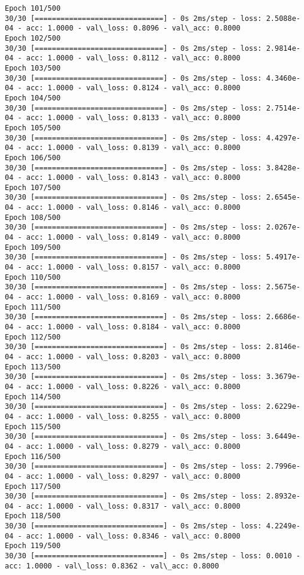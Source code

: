 \documentclass[11pt]{article}
\begin{document}
\begin{Verbatim}[commandchars=\\\{\}]
Epoch 101/500
30/30 [==============================] - 0s 2ms/step - loss: 2.5088e-04 - acc: 1.0000 - val\_loss: 0.8096 - val\_acc: 0.8000
Epoch 102/500
30/30 [==============================] - 0s 2ms/step - loss: 2.9814e-04 - acc: 1.0000 - val\_loss: 0.8112 - val\_acc: 0.8000
Epoch 103/500
30/30 [==============================] - 0s 2ms/step - loss: 4.3460e-04 - acc: 1.0000 - val\_loss: 0.8124 - val\_acc: 0.8000
Epoch 104/500
30/30 [==============================] - 0s 2ms/step - loss: 2.7514e-04 - acc: 1.0000 - val\_loss: 0.8133 - val\_acc: 0.8000
Epoch 105/500
30/30 [==============================] - 0s 2ms/step - loss: 4.4297e-04 - acc: 1.0000 - val\_loss: 0.8139 - val\_acc: 0.8000
Epoch 106/500
30/30 [==============================] - 0s 2ms/step - loss: 3.8428e-04 - acc: 1.0000 - val\_loss: 0.8143 - val\_acc: 0.8000
Epoch 107/500
30/30 [==============================] - 0s 2ms/step - loss: 2.6545e-04 - acc: 1.0000 - val\_loss: 0.8146 - val\_acc: 0.8000
Epoch 108/500
30/30 [==============================] - 0s 2ms/step - loss: 2.0267e-04 - acc: 1.0000 - val\_loss: 0.8149 - val\_acc: 0.8000
Epoch 109/500
30/30 [==============================] - 0s 2ms/step - loss: 5.4917e-04 - acc: 1.0000 - val\_loss: 0.8157 - val\_acc: 0.8000
Epoch 110/500
30/30 [==============================] - 0s 2ms/step - loss: 2.5675e-04 - acc: 1.0000 - val\_loss: 0.8169 - val\_acc: 0.8000
Epoch 111/500
30/30 [==============================] - 0s 2ms/step - loss: 2.6686e-04 - acc: 1.0000 - val\_loss: 0.8184 - val\_acc: 0.8000
Epoch 112/500
30/30 [==============================] - 0s 2ms/step - loss: 2.8146e-04 - acc: 1.0000 - val\_loss: 0.8203 - val\_acc: 0.8000
Epoch 113/500
30/30 [==============================] - 0s 2ms/step - loss: 3.3679e-04 - acc: 1.0000 - val\_loss: 0.8226 - val\_acc: 0.8000
Epoch 114/500
30/30 [==============================] - 0s 2ms/step - loss: 2.6229e-04 - acc: 1.0000 - val\_loss: 0.8255 - val\_acc: 0.8000
Epoch 115/500
30/30 [==============================] - 0s 2ms/step - loss: 3.6449e-04 - acc: 1.0000 - val\_loss: 0.8279 - val\_acc: 0.8000
Epoch 116/500
30/30 [==============================] - 0s 2ms/step - loss: 2.7996e-04 - acc: 1.0000 - val\_loss: 0.8297 - val\_acc: 0.8000
Epoch 117/500
30/30 [==============================] - 0s 2ms/step - loss: 2.8932e-04 - acc: 1.0000 - val\_loss: 0.8317 - val\_acc: 0.8000
Epoch 118/500
30/30 [==============================] - 0s 2ms/step - loss: 4.2249e-04 - acc: 1.0000 - val\_loss: 0.8346 - val\_acc: 0.8000
Epoch 119/500
30/30 [==============================] - 0s 2ms/step - loss: 0.0010 - acc: 1.0000 - val\_loss: 0.8362 - val\_acc: 0.8000

\end{Verbatim}
\end{document}

